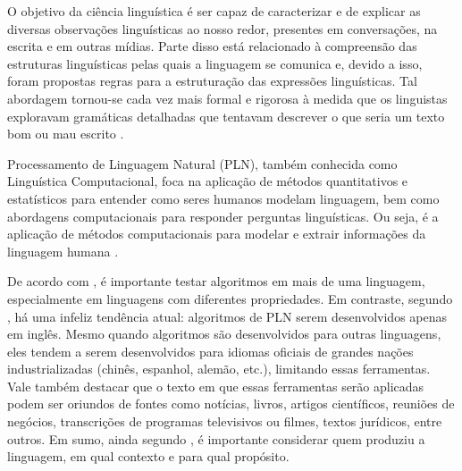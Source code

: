 \documentclass{automatextcc}
\begin{document}


O objetivo da ciência linguística é ser capaz de caracterizar e de explicar as diversas observações linguísticas ao nosso redor, presentes em conversações, na escrita e em outras mídias. Parte disso está relacionado à compreensão das estruturas linguísticas pelas quais a linguagem se comunica e, devido a isso, foram propostas regras para a estruturação das expressões linguísticas. Tal abordagem tornou-se cada vez mais formal e rigorosa à medida que os linguistas exploravam gramáticas detalhadas que tentavam descrever o que seria um texto bom ou mau escrito \citep{manning1999}.

Processamento de Linguagem Natural (PLN), também conhecida como Linguística Computacional, foca na aplicação de métodos quantitativos e estatísticos para entender como seres humanos modelam linguagem, bem como abordagens computacionais para responder perguntas linguísticas. Ou seja, é a aplicação de métodos computacionais para modelar e extrair informações da linguagem humana \citep{kamath2019}. 

De acordo com \citet{jurafsky2021}, é importante testar algoritmos em mais de uma linguagem, especialmente em linguagens com diferentes propriedades. Em contraste, segundo \citet{bender2019}, há uma infeliz tendência atual: algoritmos de PLN serem desenvolvidos apenas em inglês. Mesmo quando algoritmos são desenvolvidos para outras linguagens, eles tendem a serem desenvolvidos para idiomas oficiais de grandes nações industrializadas (chinês, espanhol, alemão, etc.), limitando essas ferramentas. Vale também destacar que o texto em que essas ferramentas serão aplicadas podem ser oriundos de fontes como notícias, livros, artigos científicos, reuniões de negócios, transcrições de programas televisivos ou filmes, textos jurídicos, entre outros. Em sumo, ainda segundo \citet{jurafsky2021}, é importante considerar quem produziu a linguagem, em qual contexto e para qual propósito.
\end{document}
